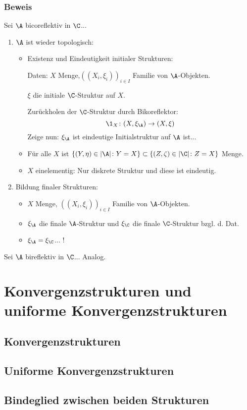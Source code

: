 \documentclass[serif,9pt]{beamer}
\begin{document}
\begin{frame}
\frametitle{Beweis}
Sei $\A$ bicoreflektiv in $\C$...
\pause
\begin{enumerate}[(1)]
\item<+-> $\A$ ist wieder topologisch:
\begin{itemize}
  \item<+-> Existenz und Eindeutigkeit initialer Strukturen:

  Daten: $X$ Menge,$((X_i, \xi_i))_{i \in I}$ Familie von $\A$-Objekten. 

  $\xi$ die initiale $\C$-Struktur auf $X$. 

  Zurückholen der $\C$-Struktur durch Bikoreflektor:
$$
\1_X \colon (X, \xi_\A) \to (X, \xi) 
$$
Zeige nun: $\xi_\A$ ist eindeutige Initialstruktur auf $\A$ ist...

\item<+-> Für alle $X$ ist $\{(Y, \eta) \in |\A| \colon Y = X \} \subset\{(Z, \zeta) \in |\C| \colon Z = X \}$ Menge.

\item<+-> $X$ einelementig: Nur diskrete Struktur und diese ist eindeutig.
\end{itemize}

\item<+-> Bildung finaler Strukturen:
\begin{itemize}
\item<+-> $X$ Menge, $((X_i, \xi_i))_{i \in I}$ Familie von $\A$-Objekten. 
\item<+-> $\xi_\A$ die finale $\A$-Struktur und $\xi_\C$ die finale $\C$-Struktur bzgl. d. Dat.
\item<+-> $\xi_\A = \xi_\C$... \pause !
\end{itemize}

\end{enumerate}

\pause
\vspace{2em}
Sei $\A$ bireflektiv in $\C$... Analog.

\end{frame}

\section{Konvergenzstrukturen und uniforme Konvergenzstrukturen}

\subsection{Konvergenzstrukturen}
\subsection{Uniforme Konvergenzstrukturen}
\subsection{Bindeglied zwischen beiden Strukturen}
\end{document}
